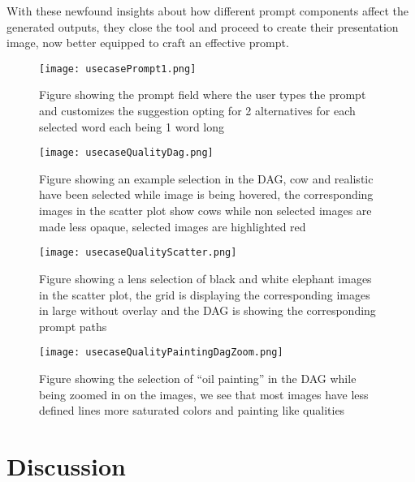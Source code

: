 \documentclass[
  a4paper,  %
  twoside,  %
  bibliography=totoc,
  headsepline,
  cleardoublepage=empty,
  parskip=half,
  draft=false
]{scrbook}
\begin{document}
 With these newfound insights about how different prompt components affect the generated outputs, they close the tool and proceed to create their presentation image, now better equipped to craft an effective prompt.
\begin{figure}[H]
	\centering
	\texttt{[image: usecasePrompt1.png]}
	\caption{Figure showing the prompt field where the user types the prompt and customizes the suggestion opting for 2 alternatives for each selected word each being 1 word long}
	\label{fig:usecasePrompt1}
\end{figure}
\begin{figure}[H]
		\centering
	\texttt{[image: usecaseQualityDag.png]}
	\caption{Figure showing an example selection in the DAG, cow and realistic have been selected while image is being hovered, the corresponding images in the scatter plot show cows while non selected images are made less opaque, selected images are highlighted red}
	\label{fig:usecaseQualityDag}
\end{figure}
\begin{figure}[H]
	\centering
	\texttt{[image: usecaseQualityScatter.png]}
	\caption{Figure showing a lens selection of black and white elephant images in the scatter plot, the grid is displaying the corresponding images in large without overlay and the DAG is showing the corresponding prompt paths}
	\label{fig:usecaseQualityScatter}
\end{figure}
\begin{figure}[H]
	\centering
	\texttt{[image: usecaseQualityPaintingDagZoom.png]}
	\caption{Figure showing the selection of \enquote{oil painting} in the DAG while being zoomed in on the images, we see that most images have less defined lines more saturated colors and painting like qualities }
	\label{fig:usecaseQualityPaintingDagZoom}
\end{figure}



\chapter{Discussion}
\label{chap:zusfas}
\end{document}
